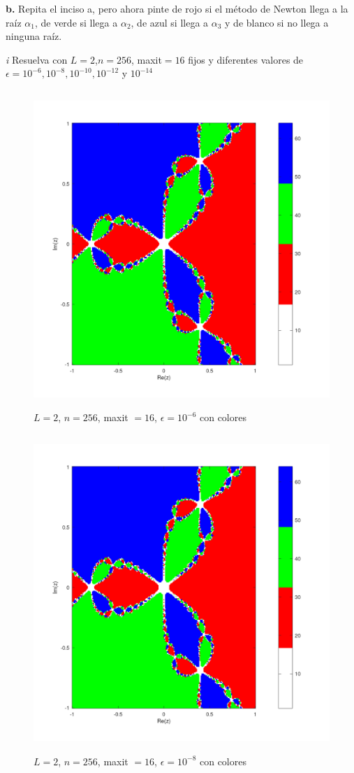 \documentclass{article} %
\begin{document}
\textbf{b.} Repita el inciso a, pero ahora pinte de rojo si el método de Newton llega a la raíz $\alpha_1$, de verde si llega a $\alpha_2$, de azul si llega a $\alpha_3$ y de blanco si no llega a ninguna raíz.

\textit{i} Resuelva con $L=2$,$n=256$, maxit$=16$ fijos y diferentes valores de $\epsilon = 10^{-6},10^{-8},10^{-10},10^{-12}$ y $10^{-14}$

\begin{figure}[H]
    \centering
    \includegraphics[width=152mm, height=120mm]{images/L2n256maxit16e10-6color.png}
    \caption{$L=2$, $n=256$, maxit $=16$, $\epsilon=10^{-6}$ con colores}
\end{figure}

\begin{figure}[H]
    \centering
    \includegraphics[width=152mm, height=120mm]{images/L2n256maxit16e10-8color.png}
    \caption{$L=2$, $n=256$, maxit $=16$, $\epsilon=10^{-8}$ con colores}
\end{figure}
\end{document}
